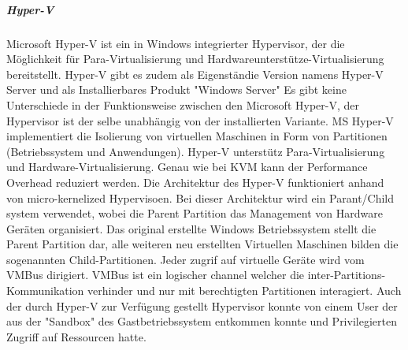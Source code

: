 \subparagraph{Hyper-V}
Microsoft Hyper-V ist ein in Windows integrierter Hypervisor, der die Möglichkeit für Para-Virtualisierung und Hardwareunterstütze-Virtualisierung bereitstellt. Hyper-V gibt es zudem als Eigenständie Version namens Hyper-V Server und als Installierbares Produkt "Windows Server" Es gibt keine Unterschiede in der Funktionsweise zwischen den Microsoft Hyper-V, der Hypervisor ist der selbe unabhängig von der installierten Variante. MS Hyper-V implementiert die Isolierung von virtuellen Maschinen in Form von Partitionen (Betriebssystem und Anwendungen). Hyper-V unterstütz Para-Virtualisierung und Hardware-Virtualisierung. Genau wie bei KVM kann der Performance Overhead reduziert werden. Die Architektur des Hyper-V funktioniert anhand von micro-kernelized Hypervisoen. Bei dieser Architektur wird ein Parant/Child system verwendet, wobei die Parent Partition das Management von Hardware Geräten organisiert. Das original erstellte Windows Betriebssystem stellt die Parent Partition dar, alle weiteren neu erstellten Virtuellen Maschinen bilden die sogenannten Child-Partitionen. Jeder zugrif auf virtuelle Geräte wird vom VMBus dirigiert. VMBus ist ein logischer channel welcher die inter-Partitions-Kommunikation verhinder und nur mit berechtigten Partitionen interagiert. Auch der durch Hyper-V zur Verfügung gestellt Hypervisor konnte von einem User der aus der "Sandbox" des Gastbetriebssystem entkommen konnte und Privilegierten Zugriff auf Ressourcen hatte\cite{Fayyad-Kazan2013BenchmarkingHypervisors}. 